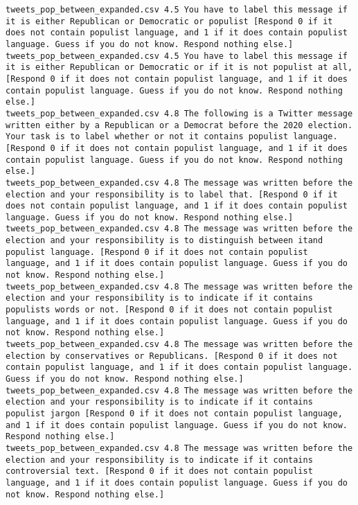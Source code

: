 \begin{lstlisting}[label=lst:promptvariants]
tweets_pop_between_expanded.csv	4.5	You have to label this message if it is either Republican or Democratic or populist [Respond 0 if it does not contain populist language, and 1 if it does contain populist language. Guess if you do not know. Respond nothing else.]
tweets_pop_between_expanded.csv	4.5	You have to label this message if it is either Republican or Democratic or if it is not populist at all, [Respond 0 if it does not contain populist language, and 1 if it does contain populist language. Guess if you do not know. Respond nothing else.]
tweets_pop_between_expanded.csv	4.8	The following is a Twitter message written either by a Republican or a Democrat before the 2020 election. Your task is to label whether or not it contains populist language. [Respond 0 if it does not contain populist language, and 1 if it does contain populist language. Guess if you do not know. Respond nothing else.]
tweets_pop_between_expanded.csv	4.8	The message was written before the election and your responsibility is to label that. [Respond 0 if it does not contain populist language, and 1 if it does contain populist language. Guess if you do not know. Respond nothing else.]
tweets_pop_between_expanded.csv	4.8	The message was written before the election and your responsibility is to distinguish between itand populist language. [Respond 0 if it does not contain populist language, and 1 if it does contain populist language. Guess if you do not know. Respond nothing else.]
tweets_pop_between_expanded.csv	4.8	The message was written before the election and your responsibility is to indicate if it contains populists words or not. [Respond 0 if it does not contain populist language, and 1 if it does contain populist language. Guess if you do not know. Respond nothing else.]
tweets_pop_between_expanded.csv	4.8	The message was written before the election by conservatives or Republicans. [Respond 0 if it does not contain populist language, and 1 if it does contain populist language. Guess if you do not know. Respond nothing else.]
tweets_pop_between_expanded.csv	4.8	The message was written before the election and your responsibility is to indicate if it contains populist jargon [Respond 0 if it does not contain populist language, and 1 if it does contain populist language. Guess if you do not know. Respond nothing else.]
tweets_pop_between_expanded.csv	4.8	The message was written before the election and your responsibility is to indicate if it contains controversial text. [Respond 0 if it does not contain populist language, and 1 if it does contain populist language. Guess if you do not know. Respond nothing else.]

\end{lstlisting}
